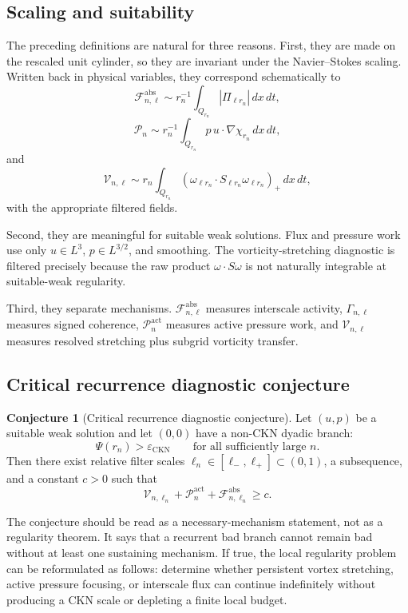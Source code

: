 \documentclass[11pt]{article}
\numberwithin{equation}{section}
\theoremstyle{plain}
\theoremstyle{definition}
\newtheorem{conjecture}[theorem]{Conjecture}
\theoremstyle{remark}
\newcommand{\eps}{\varepsilon}
\newcommand{\CKN}{\mathrm{CKN}}
\newcommand{\Vort}{\mathcal V}
\newcommand{\Flux}{\mathcal F}
\newcommand{\Press}{\mathcal P}
\newcommand{\act}{\mathrm{act}}
\newcommand{\absop}{\mathrm{abs}}
\begin{document}
\subsection{Scaling and suitability}

The preceding definitions are natural for three reasons.
First, they are made on the rescaled unit cylinder, so they are invariant under the Navier--Stokes scaling.  Written back in physical variables, they correspond schematically to
\[
    \Flux^{\absop}_{n,\ell}
    \sim
    r_n^{-1}\int_{Q_{r_n}} |\Pi_{\ell r_n}|\,dx\,dt,
\]
\[
    \Press_n
    \sim
    r_n^{-1}\int_{Q_{r_n}} p\,u\cdot\nabla\chi_{r_n}\,dx\,dt,
\]
and
\[
    \Vort_{n,\ell}
    \sim
    r_n\int_{Q_{r_n}}
    (\omega_{\ell r_n}\cdot S_{\ell r_n}\omega_{\ell r_n})_+\,dx\,dt,
\]
with the appropriate filtered fields.

Second, they are meaningful for suitable weak solutions.  Flux and pressure work use only \(u\in L^3\), \(p\in L^{3/2}\), and smoothing.  The vorticity-stretching diagnostic is filtered precisely because the raw product \(\omega\cdot S\omega\) is not naturally integrable at suitable-weak regularity.

Third, they separate mechanisms.  \(\Flux^{\absop}_{n,\ell}\) measures interscale activity, \(\Gamma_{n,\ell}\) measures signed coherence, \(\Press^{\act}_n\) measures active pressure work, and \(\Vort_{n,\ell}\) measures resolved stretching plus subgrid vorticity transfer.

\subsection{Critical recurrence diagnostic conjecture}

\begin{conjecture}[Critical recurrence diagnostic conjecture]
Let \((u,p)\) be a suitable weak solution and let \((0,0)\) have a non-CKN dyadic branch:
\[
    \Psi(r_n)>\eps_{\CKN}
    \qquad\text{for all sufficiently large } n.
\]
Then there exist relative filter scales \(\ell_n\in[\ell_-,\ell_+]\subset(0,1)\), a subsequence, and a constant \(c>0\) such that
\begin{equation}
    \Vort_{n,\ell_n}
    +
    \Press^{\act}_{n}
    +
    \Flux^{\absop}_{n,\ell_n}
    \ge c.
\end{equation}
\end{conjecture}

The conjecture should be read as a necessary-mechanism statement, not as a regularity theorem.  It says that a recurrent bad branch cannot remain bad without at least one sustaining mechanism.  If true, the local regularity problem can be reformulated as follows: determine whether persistent vortex stretching, active pressure focusing, or interscale flux can continue indefinitely without producing a CKN scale or depleting a finite local budget.
\end{document}
